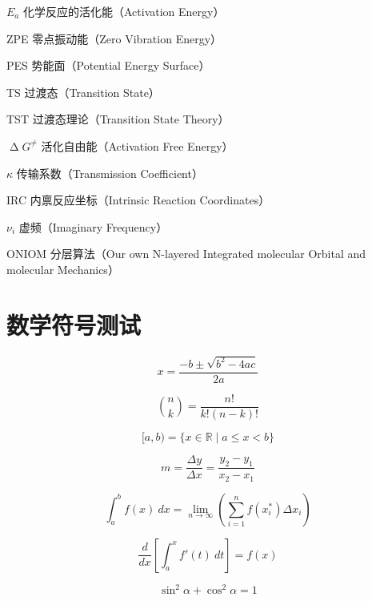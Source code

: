 \documentclass[report,oneside,UTF8,zihao=-4]{config}
\begin{document}
\begin{denotation}
  \item[$E_a$] 化学反应的活化能（Activation Energy）
  \item[ZPE] 零点振动能（Zero Vibration Energy）
  \item[PES] 势能面（Potential Energy Surface）
  \item[TS] 过渡态（Transition State）
  \item[TST] 过渡态理论（Transition State Theory）
  \item[$\upDelta G^\neq$] 活化自由能（Activation Free Energy）
  \item[$\kappa$] 传输系数（Transmission Coefficient）
  \item[IRC] 内禀反应坐标（Intrinsic Reaction Coordinates）
  \item[$\nu_i$] 虚频（Imaginary Frequency）
  \item[ONIOM] 分层算法（Our own N-layered Integrated molecular Orbital and molecular Mechanics）
\end{denotation}

\chapter{数学符号测试}

\[ x = \frac{-b \pm \sqrt{b^2 - 4ac}}{2a} \]

\[ \binom{n}{k} = \frac{n!}{k!(n-k)!} \]

\[ [a,b) = \{ x\in\mathbb{R} \mid a \le x < b \} \]

\[ m = \frac{\Delta y}{\Delta x} = \frac{y_2 - y_1}{x_2 - x_1} \]

\[ \int_a^b f(x)\ dx = \lim_{n\to\infty} \left( \sum_{i=1}^n f(x_i^*) \Delta x_i \right) \]

\[ \frac{d}{dx} \left[ \int_a^x f'(t)\ dt \right] = f(x) \]

\[ \sin^2\alpha + \cos^2\alpha = 1 \]
\end{document}
